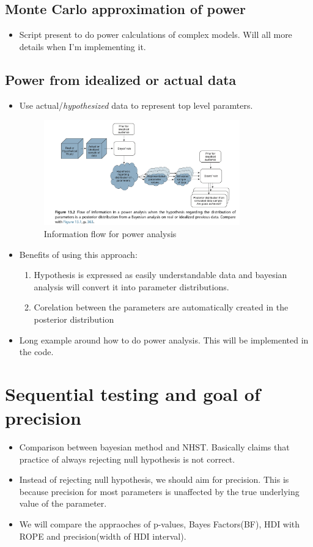 \documentclass[a4paper]{article}
\begin{document}
\subsection{Monte Carlo approximation of power}
\begin{itemize}
    \item Script present to do power calculations of complex models. Will all more details when I'm implementing it.
\end{itemize}
\subsection{Power from idealized or actual data}
\begin{itemize}
    \item Use actual/\textit{hypothesized} data to represent top level paramters.
    \begin{figure}[H]
        \centering
        \includegraphics[width=0.8\textwidth]{info_flow_power}
        \caption{Information flow for power analysis}
        \label{fig:info_flow_power}
    \end{figure}
    \item Benefits of using this approach:
    \begin{enumerate}
        \item Hypothesis is expressed as easily understandable data and bayesian analysis will convert it into parameter distributions.
        \item Corelation between the parameters are automatically created in the posterior distribution
    \end{enumerate}
    \item Long example around how to do power analysis. This will be implemented in the code.
\end{itemize}
\section{Sequential testing and goal of precision}
\begin{itemize}
    \item Comparison between bayesian method and NHST. Basically claims that practice of always rejecting null hypothesis is not correct.
    \item Instead of rejecting null hypothesis, we should aim for precision. This is because precision for most parameters is unaffected by the true underlying value of the parameter.
    \item We will compare the appraoches of p-values, Bayes Factors(BF), HDI with ROPE and precision(width of HDI interval).
\end{itemize}
\end{document}
